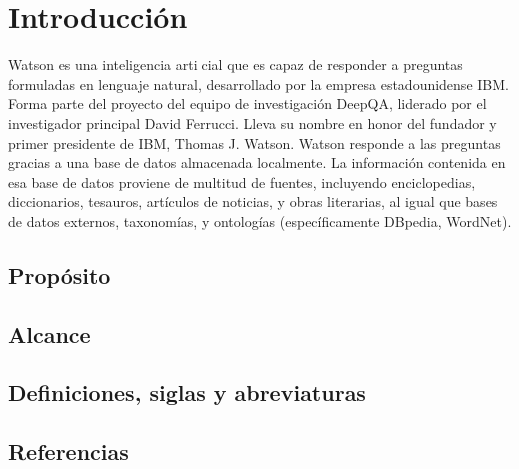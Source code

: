 \chapter{Introducción}
Watson es una inteligencia articial que es capaz de responder a preguntas
formuladas en lenguaje natural, desarrollado por la empresa estadounidense
IBM. Forma parte del proyecto del equipo de investigación DeepQA, liderado
por el investigador principal David Ferrucci. Lleva su nombre en honor del
fundador y primer presidente de IBM, Thomas J. Watson. Watson responde
a las preguntas gracias a una base de datos almacenada localmente. La
información contenida en esa base de datos proviene de multitud de fuentes,
incluyendo enciclopedias, diccionarios, tesauros, artículos de noticias, y
obras literarias, al igual que bases de datos externos, taxonomías, y ontologías
(específicamente DBpedia, WordNet).

\section{Propósito}


\section{Alcance}

\section{Definiciones, siglas y abreviaturas}

\section{Referencias}